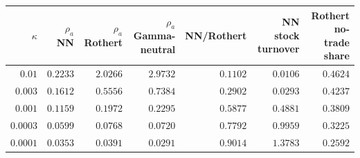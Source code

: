 \begin{tabular}{rrrrrrr}
\toprule
$\kappa$ & $\rho_a$ NN & $\rho_a$ Rothert & $\rho_a$ Gamma-neutral & NN/Rothert & NN stock turnover & Rothert no-trade share \\
\midrule
$0.01$ & $0.2233$ & $2.0266$ & $2.9732$ & $0.1102$ & $0.0106$ & $0.4624$ \\
$0.003$ & $0.1612$ & $0.5556$ & $0.7384$ & $0.2902$ & $0.0293$ & $0.4237$ \\
$0.001$ & $0.1159$ & $0.1972$ & $0.2295$ & $0.5877$ & $0.4881$ & $0.3809$ \\
$0.0003$ & $0.0599$ & $0.0768$ & $0.0720$ & $0.7792$ & $0.9959$ & $0.3225$ \\
$0.0001$ & $0.0353$ & $0.0391$ & $0.0291$ & $0.9014$ & $1.3783$ & $0.2592$ \\
\bottomrule
\end{tabular}
